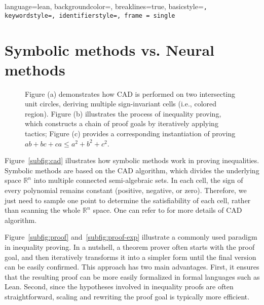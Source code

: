 \newpage
\appendix


\lstset
{
    language=lean,
    backgroundcolor=\color{black!5!white},
    breaklines=true,
    basicstyle=\tt\small,
    keywordstyle=\color{blue},
    identifierstyle=\color{magenta},
    frame = single
}

\section{Symbolic methods vs. Neural methods} \label{app:symbolic_vs_neural}

\begin{figure}[ht] 
\centering
{}
\hfill
{}
\hfill
{}
\vspace{-0.75em}
\caption{Figure (a) demonstrates how CAD is performed on two intersecting unit circles, deriving multiple sign-invariant cells (i.e., colored region). Figure (b) illustrates the process of inequality proving, which constructs a chain of proof goals by iteratively applying tactics; Figure (c) provides a corresponding instantiation of proving $ab+bc+ca \leq a ^ 2 + b ^ 2 + c ^ 2$. }
\label{fig:sym_vs_neu}
\vspace{-1.0em}
\end{figure}

Figure~\ref{subfig:cad} illustrates how symbolic methods work in proving inequalities. 
Symbolic methods are based on the CAD algorithm, which divides the underlying space $\mathbb{R}^n$ into multiple connected semi-algebraic sets. 
In each cell, the sign of every polynomial remains constant (positive, negative, or zero).
Therefore, we just need to sample one point to determine the satisfiability of each cell, rather than scanning the whole $\mathbb{R}^n$ space. 
One can refer to \citet{caviness2012quantifier, arnon1984cylindrical, jirstrand1995cylindrical} for more details of CAD algorithm.

Figure~\ref{subfig:proof} and~\ref{subfig:proof-exp} illustrate a commonly used paradigm in inequality proving. 
In a nutshell, a theorem prover often starts with the proof goal, and then iteratively transforms it into a simpler form until the final version can be easily confirmed. 
This approach has two main advantages. 
First, it ensures that the resulting proof can be more easily formalized in formal languages such as Lean. 
Second, since the hypotheses involved in inequality proofs are often straightforward, scaling and rewriting the proof goal is typically more efficient.


